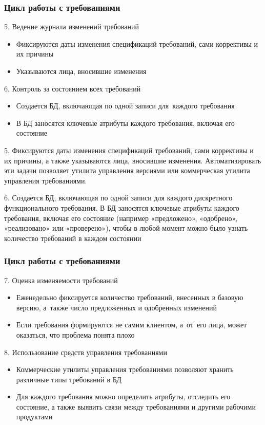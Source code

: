 \documentclass{../industrial-development}
\begin{document}
\begin{frame} \frametitle{Цикл работы с требованиями}
	5. Ведение журнала изменений требований
	\begin{itemize}
\item Фиксируются даты изменения спецификаций требований, сами коррективы и их причины
\item Указываются лица, вносившие изменения
	\end{itemize} 
	6. Контроль за состоянием всех требований
	\begin{itemize}
\item Создается БД, включающая по одной записи для~каждого требования
\item В БД заносятся ключевые атрибуты каждого требования, включая его состояние
	\end{itemize} 
\end{frame}

\lecturenotes

5. Фиксируются даты изменения спецификаций требований, сами коррективы и их причины, а также указываются лица, вносившие изменения. Автоматизировать эти задачи позволяет утилита управления версиями или коммерческая утилита управления требованиями.

6. Создается БД, включающая по одной записи для каждого дискретного функционального требования. В БД заносятся ключевые атрибуты каждого требования, включая его состояние (например «предложено», «одобрено», «реализовано» или «проверено»), чтобы в любой момент можно было узнать количество требований в каждом состоянии



\begin{frame} \frametitle{Цикл работы с требованиями}
	7. Оценка изменяемости требований
	\begin{itemize}
\item Еженедельно фиксируется количество требований, внесенных в базовую версию, а~также число предложенных и одобренных изменений
\item Если требования формируются не самим клиентом, а~от~его лица, может оказаться, что проблема понята плохо
	\end{itemize} 
	8. Использование средств управления требованиями
	\begin{itemize}
\item Коммерческие утилиты управления требованиями позволяют хранить различные типы требований в БД 
\item Для каждого требования можно определить атрибуты, отследить его состояние, а также выявить связи между требованиями и другими рабочими продуктами
	\end{itemize} 
\end{frame}
\end{document}
